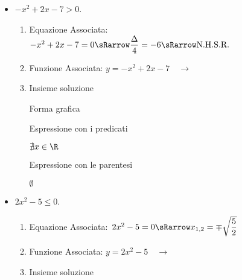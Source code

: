 \begin{esempio}
\begin{itemize}
\item $-x^2+2x-7>0$.

\begin{enumerate}
 \item
  Equazione Associata:~\(-x^2+2x-7=0 \sRarrow 
                        \dfrac{\Delta}{4} = -6 \sRarrow 
                        \text{N.H.S.R.}\)
 \item 
  \begin{minipage}{.45\textwidth}
  Funzione Associata: \(y = -x^2+2x-7 \quad \rightarrow\)
  \end{minipage}
  \begin{minipage}{.30\textwidth}
  \parabolaamidmi
  \end{minipage}
 \item 
 Insieme soluzione\\
 
  \begin{minipage}{.32\textwidth}
  Forma grafica\\[-.7em]
  
 \begin{center}
  \vspace{.4em}
 \end{center}
  \end{minipage}
  \begin{minipage}{.32\textwidth}
  Espressione con i predicati\\[-.3em]
  
 \begin{center}
  \(\nexists x \in \R\)
  \vspace{1em}
 \end{center}
  \end{minipage}
  \begin{minipage}{.32\textwidth}
  Espressione con le parentesi\\[-.3em]
  
 \begin{center}
  \(\emptyset\)
  \vspace{.8em}
 \end{center}
  \end{minipage}
\end{enumerate}

\item \(2x^2-5 \le 0\).

\begin{enumerate}
 \item
  Equazione Associata:~\(2x^2-5=0 \sRarrow 
                        x_{1, 2}= \mp \sqrt{\dfrac{5}{2}}\)
 \item 
  \begin{minipage}{.45\textwidth}
  Funzione Associata: \(y = 2x^2-5 \quad \rightarrow\)
  \end{minipage}
  \begin{minipage}{.30\textwidth}
  \end{minipage}
 \item 
 Insieme soluzione\\
 

\end{enumerate}
\end{itemize}
\end{esempio}
